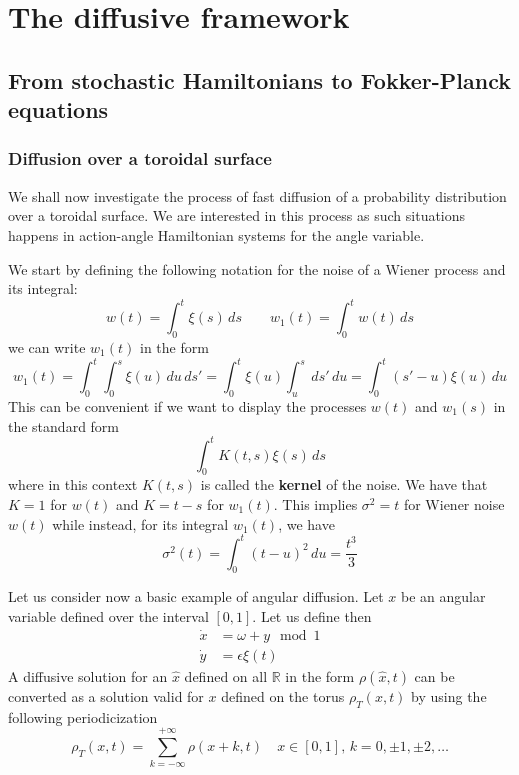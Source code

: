 
\chapter{The diffusive framework}\label{ch:the_diffusive_framework}




\section{From stochastic Hamiltonians to Fokker-Planck equations}

\subsection{Diffusion over a toroidal surface}
\label{subsec:diffusion-over-a-toroidal-surface}

We shall now investigate the process of fast diffusion of a probability distribution over a toroidal surface. We are interested in this process as such situations happens in action-angle Hamiltonian systems for the angle variable.

We start by defining the following notation for the noise of a Wiener process and its integral:
\begin{equation}
	w(t) = \int_0^t \xi(s)\,ds \quad\quad w_1(t)=\int_0^t w(t)\,ds
\end{equation}
we can write \(w_1(t)\) in the form
\begin{equation}
	w_1(t) = \int_0^t \int_0^s \xi(u)\,du\,ds' = \int_0^t \xi(u)\int_u^s\,ds'\,du = \int_0^t (s'-u)\xi(u)\,du
\end{equation}
This can be convenient if we want to display the processes \(w(t)\) and \(w_1(s)\) in the standard form 
\begin{equation}
	\int_0^t K(t,s)\xi(s)\,ds
\end{equation}
where in this context \(K(t,s)\) is called the \textbf{kernel} of the noise. We have that \(K=1\) for \(w(t)\) and \(K=t-s\) for \(w_1(t)\). This implies \(\sigma^2 = t\) for Wiener noise \(w(t)\) while instead, for its integral \(w_1(t)\), we have
\begin{equation}
	\sigma^2(t) = \int_0^t (t-u)^2\,du = \frac{t^3}{3}
\end{equation}

Let us consider now a basic example of angular diffusion. Let \(x\) be an angular variable defined over the interval \([0,1]\). Let us define then
\begin{equation}
	\begin{aligned}
		\dot{x} &= \omega + y \mod{1} \\
		\dot{y} &= \epsilon\xi(t)	
	\end{aligned}
	\label{eq:langevin_toro}
\end{equation}
A diffusive solution for an \(\hat{x}\) defined on all \(\mathbb{R}\) in the form \(\rho(\hat{x},t)\) can be converted as a solution valid for \(x\) defined on the torus \(\rho_T(x,t)\) by using the following periodicization
\begin{equation}
	\rho_T(x,t) = \sum_{k=-\infty}^{+\infty} \rho(x+k,t) \quad x\in[0,1],\,k = 0,\pm 1, \pm 2, \ldots
\end{equation}

